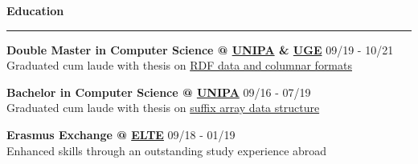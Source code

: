 \documentclass[11pt,letterpaper]{article}
\begin{document}
\begin{justify}
      {\Large \textbf{Education} \strut}
      \hrule
      \begin{itemize}[label={}, leftmargin=0pt]
            \begin{item}
                  \textbf{Double Master in Computer Science @ \href{https://www.unipa.it/mobilita/en/}{UNIPA} \& \href{https://www.univ-gustave-eiffel.fr/en/}{UGE}}
                  \hfill
                  \small{09/19 - 10/21}
                  \\
                  Graduated cum laude with thesis on \href{https://raw.githubusercontent.com/dariocurr/thesis/main/thesis.pdf}{RDF data and columnar formats}
            \end{item}
            \begin{item}
                  \textbf{Bachelor in Computer Science @ \href{https://www.unipa.it/mobilita/en/}{UNIPA}}
                  \hfill
                  \small{09/16 - 07/19}
                  \\
                  Graduated cum laude with thesis on \href{https://dariocurr.github.io/assets/img/poster.png}{suffix array data structure}
            \end{item}
            \begin{item}
                  \textbf{Erasmus Exchange @ \href{https://www.elte.hu/en/}{ELTE}}
                  \hfill
                  \small{09/18 - 01/19}
                  \\
                  Enhanced skills through an outstanding study experience abroad
            \end{item}
      \end{itemize}


\end{justify}
\end{document}
